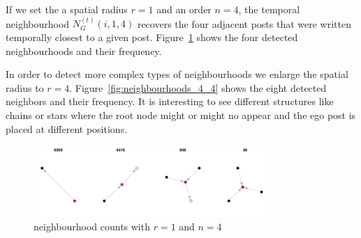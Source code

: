 \documentclass[9pt,technote]{IEEEtran}
\begin{document}
If we set the a spatial radius $r=1$ and an order $n=4$, the temporal neighbourhood $N_{G}^{(t)}(i, 1, 4)$ recovers the four adjacent posts that were written temporally closest to a given post. Figure~\ref{fig:neighbourhoods_1_4} shows the four detected neighbourhoods and their frequency.

In order to detect more complex types of neighbourhoods we enlarge the spatial radius to $r=4$. Figure~\ref{fig:neighbourhoods_4_4} shows the eight detected neighbors and their frequency. It is interesting to see different structures like chains or stars where the root node might or might no appear and the ego post is placed at different positions.

\begin{figure}
	\centering
	\includegraphics[width=0.8\textwidth]{neighbourhoods_1_4}
	\caption{neighbourhood counts with $r=1$ and $n=4$}
	\label{fig:neighbourhoods_1_4}
\end{figure}
\end{document}
